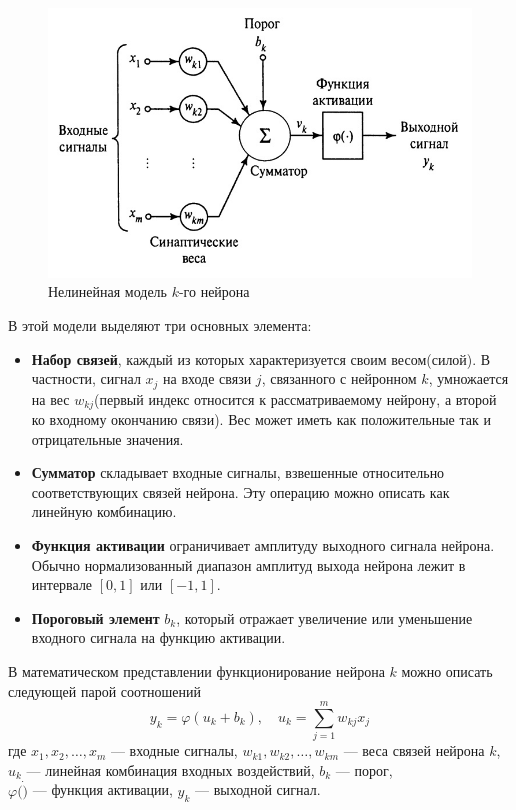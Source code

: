 \documentclass[12pt, a4paper]{article}
\renewcommand{\phi}{\varphi}
\begin{document}
\begin{figure}[!h]
	\centering
	\includegraphics[width=0.8\linewidth]{neiron}
	\caption{Нелинейная модель $k$-го нейрона}
	\label{neiron}
\end{figure}

В этой модели выделяют три основных элемента:
\begin{itemize}
	\item \textbf{Набор связей}, каждый из которых характеризуется своим весом(силой). В частности, сигнал $x_j$ на входе связи $j$, связанного с нейронном $k$, умножается на вес $w_{kj}$(первый индекс относится к рассматриваемому нейрону, а второй ко входному окончанию связи). Вес может иметь как положительные так и отрицательные значения.
	\item \textbf{Сумматор} складывает входные сигналы, взвешенные относительно соответствующих связей нейрона. Эту операцию можно описать как линейную комбинацию.
	\item \textbf{Функция активации} ограничивает амплитуду выходного сигнала нейрона. Обычно нормализованный диапазон амплитуд выхода нейрона лежит в интервале $[0, 1]$ или $[-1, 1]$.
	\item \textbf{Пороговый элемент} $b_k$, который отражает увеличение или уменьшение входного сигнала на функцию активации.
\end{itemize}

\newpage
В математическом представлении функционирование нейрона $k$ можно описать следующей парой соотношений
\begin{equation}
	y_k = \phi(u_k + b_k), \quad u_k = \sum_{j = 1}^{m} w_{kj}x_j 
	\label{1}
\end{equation}
где $x_1, x_2, \dots, x_m$ --- входные сигналы,
$w_{k1}, w_{k2}, \dots, w_{km}$ --- веса связей нейрона $k$, \\
$u_k $ --- линейная комбинация входных воздействий,
$b_k$ --- порог,\\
$ \phi(\dot) $ --- функция активации,
$ y_k $ --- выходной сигнал.
\end{document}
